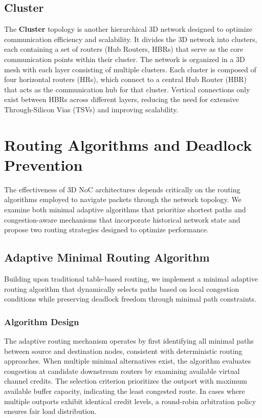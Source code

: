 \documentclass[11pt]{article}
\begin{document}
\subsection{Cluster}

The \textbf{Cluster} topology is another hierarchical 3D network designed to optimize communication efficiency and scalability. It divides the 3D network into clusters, each containing a set of routers (Hub Routers, HBRs) that serve as the core communication points within their cluster. The network is organized in a 3D mesh with each layer consisting of multiple clusters. Each cluster is composed of four horizontal routers (HRs), which connect to a central Hub Router (HBR) that acts as the communication hub for that cluster. Vertical connections only exist between HBRs across different layers, reducing the need for extensive Through-Silicon Vias (TSVs) and improving scalability.

\section{Routing Algorithms and Deadlock Prevention}

The effectiveness of 3D NoC architectures depends critically on the routing algorithms employed to navigate packets through the network topology. We examine both minimal adaptive algorithms that prioritize shortest paths and congestion-aware mechanisms that incorporate historical network state and propose two routing strategies designed to optimize performance.

\subsection{Adaptive Minimal Routing Algorithm}

Building upon traditional table-based routing, we implement a minimal adaptive routing algorithm that dynamically selects paths based on local congestion conditions while preserving deadlock freedom through minimal path constraints.

\subsubsection{Algorithm Design}
The adaptive routing mechanism operates by first identifying all minimal paths between source and destination nodes, consistent with deterministic routing approaches. When multiple minimal alternatives exist, the algorithm evaluates congestion at candidate downstream routers by examining available virtual channel credits. The selection criterion prioritizes the outport with maximum available buffer capacity, indicating the least congested route. In cases where multiple outports exhibit identical credit levels, a round-robin arbitration policy ensures fair load distribution.
\end{document}
